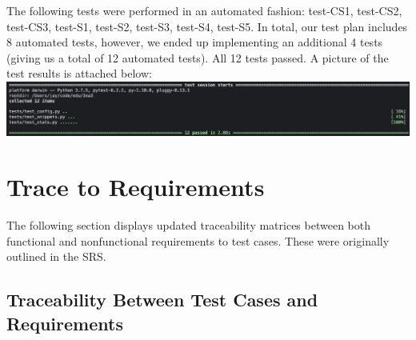 \documentclass[12pt, titlepage]{article}
\begin{document}
The following tests were performed in an automated fashion: test-CS1, test-CS2, test-CS3, test-S1, test-S2, test-S3, test-S4, test-S5. In total, our test plan includes 8 automated tests, however, we ended up implementing an additional 4 tests (giving us a total of 12 automated tests). All 12 tests passed. A picture of the test results is attached below: \\

\includegraphics[width=\textwidth]{testResults.png}



\newpage
\section{Trace to Requirements}

The following section displays updated traceability matrices between both functional and nonfunctional requirements to test cases. These were originally outlined in the SRS.

\subsection{Traceability Between Test Cases and Requirements}
\end{document}
